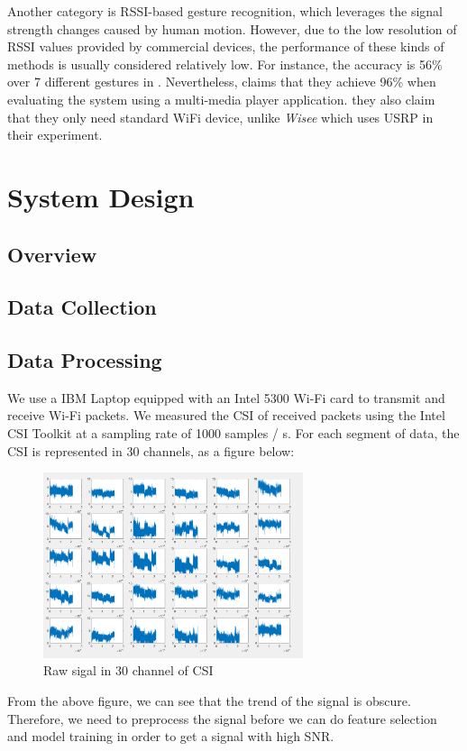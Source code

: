 \documentclass[conference]{IEEEtran}
\begin{document}
Another category is RSSI-based gesture recognition, which leverages the signal strength changes caused by human motion.
However, due to the low resolution of RSSI values provided by commercial devices, the performance of these kinds of methods is usually considered relatively low.
For instance, the accuracy is 56\% over 7 different gestures in \cite{sigg2014telepathic}.
Nevertheless, \cite{abdelnasser2015wigest} claims that they achieve 96\% when evaluating the system using a multi-media player application.
they also claim that they only need standard WiFi device, unlike \emph{Wisee} which uses USRP in their experiment.


\section{System Design} \label{section-design}
\subsection{Overview}
\subsection{Data Collection}
\subsection{Data Processing}
We use a IBM Laptop equipped with an Intel 5300 Wi-Fi card to transmit and receive Wi-Fi packets. We measured the CSI of received packets using the Intel CSI Toolkit at a sampling rate of 1000 samples / s. For each segment of data, the CSI is represented in 30 channels, as a figure below:
\begin{figure}[H]
\includegraphics[width=3in]{Original.png}
\caption{Raw sigal in 30 channel of CSI}
\end{figure}
From the above figure, we can see that the trend of the signal is obscure. Therefore, we need to preprocess the signal before we can do feature selection and model training in order to get a signal with high SNR.
\end{document}
